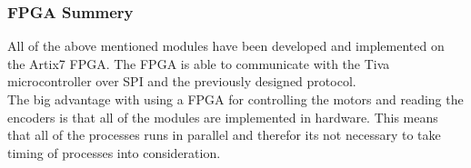 \documentclass[../../../main]{subfiles}
\begin{document}
\subsubsection{FPGA Summery}
All of the above mentioned modules have been developed and implemented on the Artix7 FPGA.
The FPGA is able to communicate with the Tiva microcontroller over SPI and the previously designed protocol.
\\
The big advantage with using a FPGA for controlling the motors and reading the encoders is that all of the modules are implemented in hardware.
This means that all of the processes runs in parallel and therefor its not necessary to take timing of processes into consideration.
\end{document}
